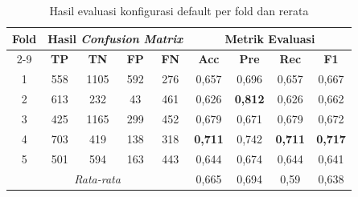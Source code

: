 
\begin{table}[htbp]
    \centering
    \caption{Hasil evaluasi konfigurasi default per fold dan rerata}
    \label{tab:evaluasi-fold}
    \begin{tabular}{|c|c|c|c|c|c|c|c|c|}
        \hline
        \multirow{2}{*}{\textbf{Fold}} & \multicolumn{4}{c|}{\textbf{Hasil \textit{Confusion Matrix}}} & \multicolumn{4}{c|}{\textbf{Metrik Evaluasi}} \\ \cline{2-9}
         & \textbf{TP} & \textbf{TN} & \textbf{FP} & \textbf{FN} & \textbf{Acc} & \textbf{Pre} & \textbf{Rec} & \textbf{F1} \\ \hline
        1 & 558 & 1105 & 592 & 276 & 0,657 & 0,696 & 0,657 & 0,667 \\ \hline
        2 & 613 & 232 & 43 & 461 & 0,626 & \textbf{0,812} & 0,626 & 0,662 \\ \hline
        3 & 425 & 1165 & 299 & 452 & 0,679 & 0,671 & 0,679 & 0,672 \\ \hline
        4 & 703 & 419 & 138 & 318 & \textbf{0,711} & 0,742 & \textbf{0,711} & \textbf{0,717} \\ \hline
        5 & 501 & 594 & 163 & 443 & 0,644 & 0,674 & 0,644 & 0,641 \\ \hline
        \multicolumn{5}{|c|}{\textit{Rata-rata}} & 0,665 & 0,694 & 0,59 & 0,638 \\ \hline
    \end{tabular}
\end{table}


